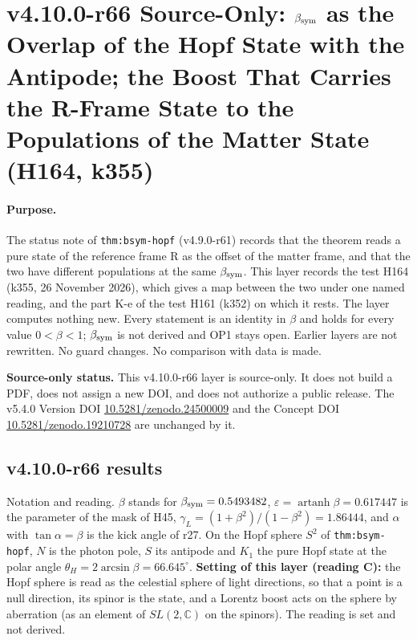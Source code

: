 
\clearpage
\section*{v4.10.0-r66 Source-Only: \texorpdfstring{\(\beta_{\rm sym}\)}{beta sym} as the Overlap of the Hopf State with the Antipode; the Boost That Carries the R-Frame State to the Populations of the Matter State (H164, k355)}
\label{sec:v4100-r66-bsym-overlap-boost}

\paragraph{Purpose.}
The status note of \texttt{thm:bsym-hopf} (v4.9.0-r61) records that the theorem reads a pure state of the reference frame R as the offset of the
matter frame, and that the two have different populations at the same \(\beta_{\rm sym}\).  This layer records the test H164 (k355, 26 November
2026), which gives a map between the two under one named reading, and the part K-e of the test H161 (k352) on which it rests.  The layer computes
nothing new.  Every statement is an identity in \(\beta\) and holds for every value \(0<\beta<1\); \(\beta_{\rm sym}\) is not derived and OP1
stays open.  Earlier layers are not rewritten.  No guard changes.  No comparison with data is made.

\noindent\textbf{Source-only status.}
This v4.10.0-r66 layer is source-only.  It does not build a PDF, does not assign a new DOI,
and does not authorize a public release.  The v5.4.0 Version DOI
\href{https://doi.org/10.5281/zenodo.24500009}{10.5281/zenodo.24500009} and the Concept DOI
\href{https://doi.org/10.5281/zenodo.19210728}{10.5281/zenodo.19210728} are unchanged by it.

\subsection*{v4.10.0-r66 results}
\label{subsec:v4100-r66-results}

Notation and reading.  \(\beta\) stands for \(\beta_{\rm sym}=0.5493482\), \(\varepsilon=\operatorname{artanh}\beta=0.617447\) is the parameter of the
mask of H45, \(\gamma_L=(1+\beta^2)/(1-\beta^2)=1.86444\), and \(\alpha\) with \(\tan\alpha=\beta\) is the kick angle of r27.  On the Hopf sphere
\(S^2\) of \texttt{thm:bsym-hopf}, \(N\) is the photon pole, \(S\) its antipode and \(K_1\) the pure Hopf state at the polar angle
\(\theta_H=2\arcsin\beta=66.645^\circ\).  \textbf{Setting of this layer (reading C):} the Hopf sphere is read as the celestial sphere of light
directions, so that a point is a null direction, its spinor is the state, and a Lorentz boost acts on the sphere by aberration (as an element of
\(SL(2,\mathbb C)\) on the spinors).  The reading is set and not derived.

